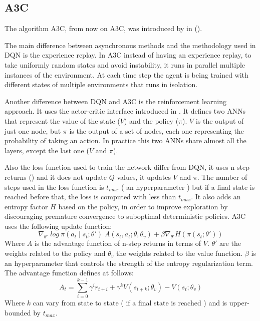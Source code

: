\subsection{\acl{A3C}\label{subsec:A3C}}
The algorithm \acl{A3C}, from now on \ac{A3C}, was introduced by \citeauthor{mnih2016A3C} in
 (\citeyear{mnih2016A3C}).

The main difference between asynchronous methods and the methodology used in \ac{DQN} is the experience replay.
In \ac{A3C} instead of having an experience replay, to take uniformly random states and avoid instability, it runs in
parallel multiple instances of the environment.
At each time step the agent is being trained with different states of multiple environments that runs in isolation.

Another difference between \ac{DQN} and \ac{A3C} is the reinforcement learning approach.
It uses the actor-critic interface introduced in .
It defines two \acp{ANN} that represent the value of the state ($V$) and the policy ($\pi$).
$V$ is the output of just one node, but $\pi$ is the output of a set of nodes, each one representing the probability of taking
an action.
In practice this two \acp{ANN} share almost all the layers, except the last one ($V$ and $\pi$).

Also the loss function used to train the network differ from \ac{DQN}, it uses n-step returns () and it does not
update $Q$ values, it updates $V$ and $\pi$.
The number of steps used in the loss function is $t_{max}$ ( an hyperparameter ) but if a
final state is reached before that, the loss is computed with less than $t_{max}$.
It also adds an entropy factor $H$ based on the policy, in order to improve exploration by discouraging premature
convergence to suboptimal deterministic policies.
\ac{A3C} uses the following update function:
\begin{equation}
    \nabla_{\theta'}\;log\:\pi(a_t\mid s_t;\theta')\;A(s_t,a_t;\theta,\theta_v)+\beta\nabla_{\theta'}H(\pi(s_t;\theta'))
\end{equation}
Where $A$ is the advantage function of n-step returns in terms of $V$.
$\theta'$ are the weights related to the policy and $\theta_v$ the weights related to the value function.
$\beta$ is an hyperparameter that controls the strength of the entropy regularization term.
The advantage function defines at follows:
\begin{equation}
    A_t=\sum^{k-1}_{i=0}\gamma^i r_{t+i}+\gamma^k V(s_{t+k};\theta_v)-V(s_t;\theta_v)
\end{equation}
Where $k$ can vary from state to state ( if a final state is reached ) and is upper-bounded by $t_{max}$.

